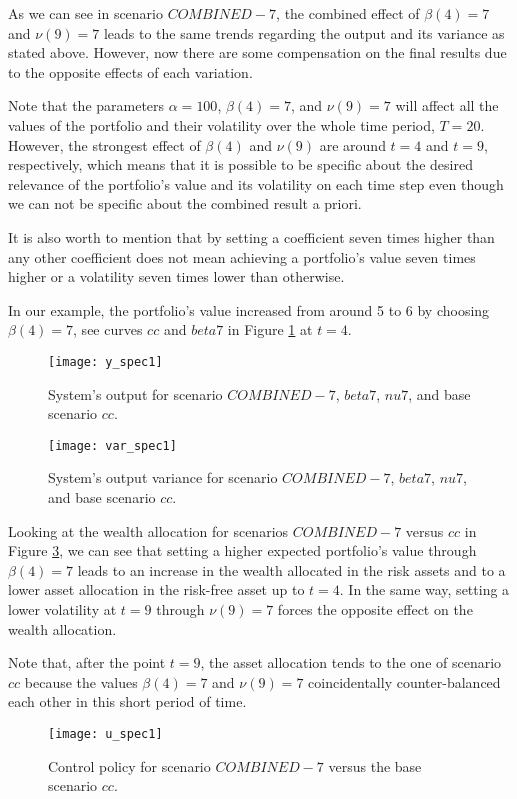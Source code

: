 As we can see in scenario $COMBINED-7$, the combined effect of $\beta(4)=7$ and $\nu(9)=7$ leads to the same trends regarding the output and its variance as stated above. However, now there are some compensation on the final results due to the opposite effects of each variation.

Note that the parameters $\alpha=100$, $\beta(4)=7$, and $\nu(9)=7$ will affect all the values of the portfolio and their volatility over the whole time period, $T=20$. However, the strongest effect of $\beta(4)$ and $\nu(9)$ are around $t=4$ and $t=9$, respectively, which means that it is possible to be specific about the desired relevance of the portfolio's value and its volatility on each time step even though we can not be specific about the combined result a priori.

It is also worth to mention that by setting a coefficient seven times higher than any other coefficient does not mean achieving a portfolio's value seven times higher or a volatility seven times lower than otherwise.

In our example, the portfolio's value increased from around 5 to 6 by choosing $\beta(4)=7$, see curves $cc$ and $beta7$ in Figure \ref{fig:y_spec1} at $t=4$.
%
\begin{figure} [H]
    \caption{System's output for scenario $COMBINED-7$, $beta7$, $nu7$, and base scenario $cc$.}
    \centering
    \texttt{[image: y\_spec1]}
    \label{fig:y_spec1}
\end{figure}
%
\begin{figure} [H]
    \caption{System's output variance for scenario $COMBINED-7$, $beta7$, $nu7$, and base scenario $cc$.}
    \centering
    \texttt{[image: var\_spec1]}
    \label{fig:var_spec1}
\end{figure}

Looking at the wealth allocation for scenarios $COMBINED-7$ versus $cc$ in Figure \ref{fig:u_spec1}, we can see that setting a higher expected portfolio's value through  $\beta(4)=7$ leads to an increase in the wealth allocated in the risk assets and to a lower asset allocation in the risk-free asset up to $t=4$. In the same way, setting a lower volatility at $t=9$ through $\nu(9)=7$ forces the opposite effect on the wealth allocation.

Note that, after the point $t=9$, the asset allocation tends to the one of scenario $cc$ because the values $\beta(4)=7$ and $\nu(9)=7$ coincidentally counter-balanced each other in this short period of time. %
%
\begin{figure} [H]
    \caption{Control policy for scenario $COMBINED-7$ versus the base scenario $cc$.}
    \centering
    \texttt{[image: u\_spec1]}
    \label{fig:u_spec1}
\end{figure}

